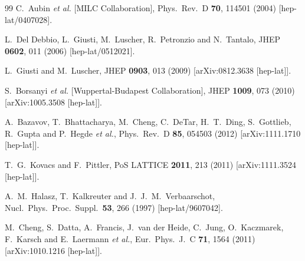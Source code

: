\documentclass[twocolumn, prd, preprintnumbers, amsmath,
  amssymb, showpacs, floatfix]{revtex4-1}
\begin{document}
\begin{thebibliography}{99}
  C.~Aubin {\it et al.}  [MILC Collaboration],
  Phys.\ Rev.\ D {\bf 70}, 114501 (2004)
  [hep-lat/0407028].

  L.~Del Debbio, L.~Giusti, M.~Luscher, R.~Petronzio and N.~Tantalo,
  JHEP {\bf 0602}, 011 (2006)
  [hep-lat/0512021].

  L.~Giusti and M.~Luscher,
  JHEP {\bf 0903}, 013 (2009)
  [arXiv:0812.3638 [hep-lat]].

  S.~Borsanyi {\it et al.}  [Wuppertal-Budapest Collaboration],
  JHEP {\bf 1009}, 073 (2010)
  [arXiv:1005.3508 [hep-lat]].

  A.~Bazavov, T.~Bhattacharya, M.~Cheng, C.~DeTar, H.~T.~Ding, S.~Gottlieb,
  R.~Gupta and P.~Hegde {\it et al.}, 
  Phys.\ Rev.\ D {\bf 85}, 054503 (2012)
  [arXiv:1111.1710 [hep-lat]].

  T.~G.~Kovacs and F.~Pittler,
  PoS LATTICE {\bf 2011}, 213 (2011)
  [arXiv:1111.3524 [hep-lat]].

  A.~M.~Halasz, T.~Kalkreuter and J.~J.~M.~Verbaarschot,
  Nucl.\ Phys.\ Proc.\ Suppl.\  {\bf 53}, 266 (1997)
  [hep-lat/9607042].

M.~Cheng, S.~Datta, A.~Francis, J.~van der Heide,
  C.~Jung, O.~Kaczmarek, F.~Karsch and E.~Laermann {\it et al.},
  Eur.\ Phys.\ J.\ C {\bf 71}, 1564 (2011)
  [arXiv:1010.1216 [hep-lat]].


\end{thebibliography}
\end{document}
